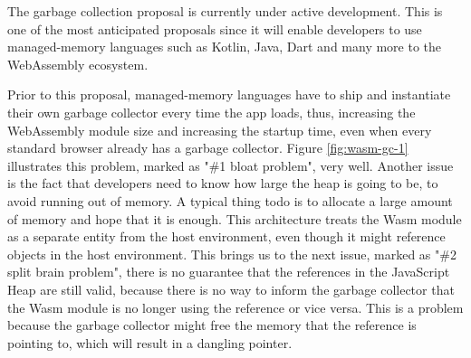 The garbage collection proposal \cite{webassemblycommunity_2023_gc} is currently under active development. This is one of the most anticipated proposals since it will enable developers to use managed-memory languages such as Kotlin, Java, Dart and many more to the WebAssembly ecosystem. 

Prior to this proposal, managed-memory languages have to ship and instantiate their own garbage collector every time the app loads, thus, increasing the \gls{WebAssembly} module size and increasing the startup time, even when every standard browser already has a garbage collector. Figure \ref{fig:wasm-gc-1} illustrates this problem, marked as "\#1 bloat problem", very well. Another issue is the fact that developers need to know how large the heap is going to be, to avoid running out of memory. A typical thing todo is to allocate a large amount of memory and hope that it is enough. This architecture treats the Wasm module as a separate entity from the host environment, even though it might reference objects in the host environment. This brings us to the next issue, marked as "\#2 split brain problem", there is no guarantee that the references in the JavaScript Heap are still valid, because there is no way to inform the garbage collector that the Wasm module is no longer using the reference or vice versa. This is a problem because the garbage collector might free the memory that the reference is pointing to, which will result in a dangling pointer. 

